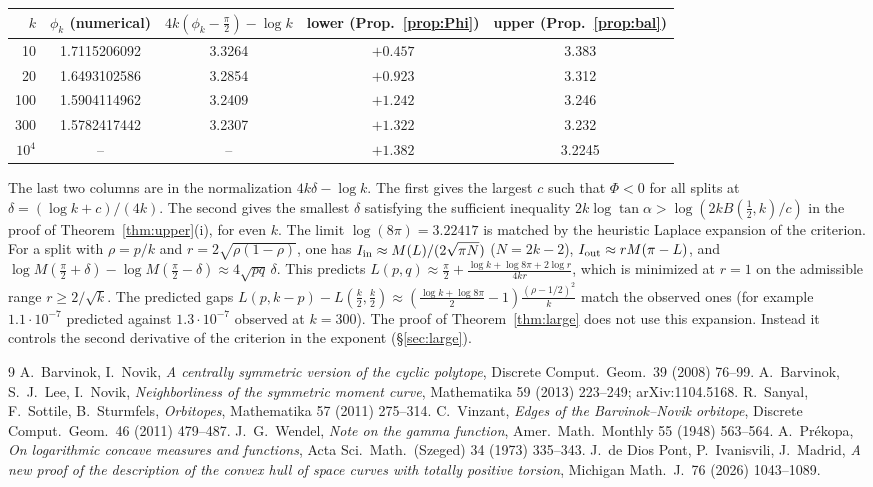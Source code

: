 \documentclass[11pt]{amsart}
\theoremstyle{definition}
\begin{document}
\begin{center}\small
\begin{tabular}{rcccc}
\toprule
$k$ & $\phi_k$ (numerical) & $4k(\phi_k-\frac\pi2)-\log k$ & lower (Prop.~\ref{prop:Phi}) & upper (Prop.~\ref{prop:bal}) \\
\midrule
10 & 1.7115206092 & 3.3264 & $+0.457$ & 3.383\\
20 & 1.6493102586 & 3.2854 & $+0.923$ & 3.312\\
100 & 1.5904114962 & 3.2409 & $+1.242$ & 3.246\\
300 & 1.5782417442 & 3.2307 & $+1.322$ & 3.232\\
$10^4$ & -- & -- & $+1.382$ & 3.2245\\
\bottomrule
\end{tabular}
\end{center}
The last two columns are in the normalization $4k\delta-\log k$. The first gives the largest $c$ such that $\Phi<0$ for all splits at
$\delta=(\log k+c)/(4k)$. The second gives the smallest $\delta$ satisfying the sufficient inequality
$2k\log\tan\alpha>\log(2kB(\frac12,k)/c)$ in the proof of Theorem~\ref{thm:upper}(i), for even $k$. The limit $\log(8\pi)=3.22417$ is matched by the heuristic Laplace expansion of the criterion. For a split
with $\rho=p/k$ and $r=2\sqrt{\rho(1-\rho)}$, one has $I_{\rm in}\approx M(L)/(2\sqrt{\pi N})$ ($N=2k-2$),
$I_{\rm out}\approx rM(\pi-L)$, and $\log M(\frac\pi2+\delta)-\log M(\frac\pi2-\delta)\approx4\sqrt{pq}\,\delta$. This predicts
$L(p,q)\approx\frac\pi2+\frac{\log k+\log8\pi+2\log r}{4kr}$, which is minimized at $r=1$ on the admissible range $r\ge2/\sqrt k$. The
predicted gaps $L(p,k-p)-L(\frac k2,\frac k2)\approx(\frac{\log k+\log8\pi}2-1)\frac{(\rho-1/2)^2}k$ match the observed ones (for example
$1.1\cdot10^{-7}$ predicted against $1.3\cdot10^{-7}$ observed at $k=300$). The proof of Theorem~\ref{thm:large} does not use this expansion. Instead it
controls the second derivative of the criterion in the exponent (\S\ref{sec:large}).

\begin{thebibliography}{9}
 A.~Barvinok, I.~Novik, \emph{A centrally symmetric version of the cyclic polytope}, Discrete Comput.\ Geom.\ 39 (2008) 76--99.
 A.~Barvinok, S.~J.~Lee, I.~Novik, \emph{Neighborliness of the symmetric moment curve}, Mathematika 59 (2013) 223--249; arXiv:1104.5168.
 R.~Sanyal, F.~Sottile, B.~Sturmfels, \emph{Orbitopes}, Mathematika 57 (2011) 275--314.
 C.~Vinzant, \emph{Edges of the Barvinok--Novik orbitope}, Discrete Comput.\ Geom.\ 46 (2011) 479--487.
 J.~G.~Wendel, \emph{Note on the gamma function}, Amer.\ Math.\ Monthly 55 (1948) 563--564.
 A.~Pr\'ekopa, \emph{On logarithmic concave measures and functions}, Acta Sci.\ Math.\ (Szeged) 34 (1973) 335--343.
 J.~de Dios Pont, P.~Ivanisvili, J.~Madrid, \emph{A new proof of the description of the convex hull of space curves with totally positive torsion}, Michigan Math.\ J.\ 76 (2026) 1043--1089.
\end{thebibliography}
\end{document}

